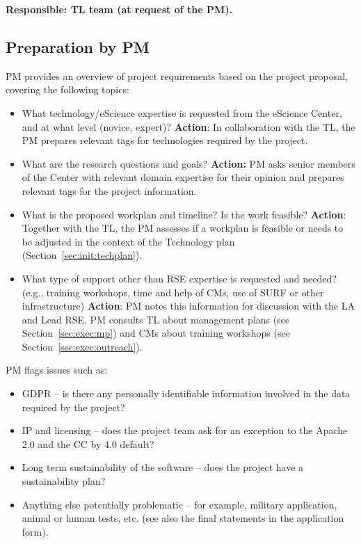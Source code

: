 \textbf{Responsible: TL team (at request of the PM).}

\subsection{Preparation by PM}
PM provides an overview of project requirements based on the project proposal, covering the following topics:

\begin{itemize}
\item What technology/eScience expertise is requested from the eScience Center, and at what level (novice, expert)?
\textbf{Action}: In collaboration with the TL, the PM prepares relevant tags for technologies required by the project.
\item What are the research questions and goals? \textbf{Action:} PM asks senior members of the Center with relevant domain
expertise for their opinion and prepares relevant tags for the project information.
\item What is the proposed workplan and timeline? Is the work feasible? \textbf{Action}: Together with the TL, the PM assesses
if a workplan is feasible or needs to be adjusted in the context of the Technology plan (Section~\ref{sec:init:techplan}).
\item What type of support other than RSE expertise is requested and needed? (e.g., training workshops, time and help of CMs,
use of SURF or other infrastructure) \textbf{Action}: PM notes this information for discussion with the LA and Lead
RSE. PM consults TL about management plans (see Section~\ref{sec:exec:mp}) and CMs about training workshops (see
Section~\ref{sec:exec:outreach}).
\end{itemize}
PM flags issues such as:
\begin{itemize}
\item GDPR – is there any personally identifiable information involved in the data required by the project? 
\item IP and licensing – does the project team ask for an exception to the Apache 2.0 and the CC by 4.0 default? 
\item Long term sustainability of the software – does the project have a sustainability plan? 
\item Anything else potentially problematic – for example, military application, animal or human tests, etc. (see also the
final statements in the application form).
\end{itemize}

